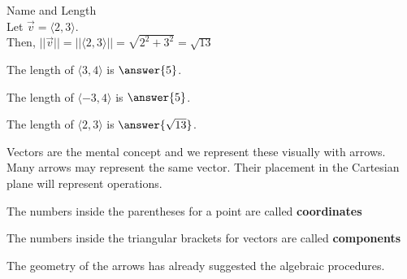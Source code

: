 \documentclass{ximera}
\begin{document}
\begin{example} Name and Length \\

Let $\vec{v} = \langle 2, 3 \rangle$. \\

Then, $|| \vec{v} || = || \langle 2, 3 \rangle || = \sqrt{2^2 + 3^2} = \sqrt{13}$

\end{example}







\begin{question} 


The length of  $\langle 3, 4 \rangle$ is $\answer{5}$.



\end{question}






\begin{question} 


The length of  $\langle -3, 4 \rangle$ is $\answer{5}$.



\end{question}



\begin{question} 


The length of  $\langle 2, 3 \rangle$ is $\answer{\sqrt{13}}$.



\end{question}




Vectors are the mental concept and we represent these visually with arrows. Many arrows may represent the same vector.  Their placement in the Cartesian plane will represent operations.


The numbers inside the parentheses for a point are called \textbf{\textcolor{purple!85!blue}{coordinates}}  

The numbers inside the triangular brackets for vectors are called \textbf{\textcolor{purple!85!blue}{components}}  



The geometry of the arrows has already suggested the algebraic procedures.
\end{document}
